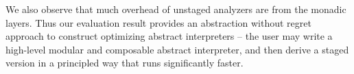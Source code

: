 We also observe that much overhead of unstaged analyzers are from the monadic
layers. Thus our evaluation result provides an abstraction without regret
approach to construct optimizing abstract interpreters -- the user may write a
high-level modular and composable abstract interpreter, and then derive a staged
version in a principled way that runs significantly faster.
